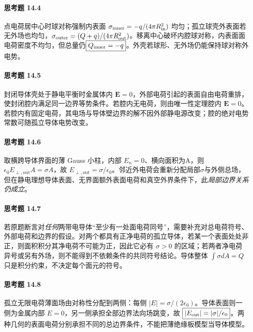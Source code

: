 \paragraph{思考题 14.4}
点电荷居中心时球对称强制内表面 \(\sigma_{\rm inner}=-q/(4\pi R_{\rm in}^2)\) 均匀；孤立球壳外表面若无外场也均匀，\(\sigma_{\rm outer}=(Q+q)/(4\pi R_{\rm out}^2)\)。移离中心破坏内腔球对称，内表面面电荷密度不均匀，但总量仍\(\boxed{Q_{\rm inner}=-q}\)。外壳若球形、无外场仍能保持球对称外电势。

\paragraph{思考题 14.5}
封闭导体壳处于静电平衡时金属体内 \(\boldsymbol E=0\)，外部电荷引起的表面自由电荷重排，使封闭腔内满足同一边界等势条件。若腔内无电荷，则由唯一性定理腔内 \(\boldsymbol E=0\)。若腔内有固定电荷，其电场与导体壁边界的解不因外部静电源改变；腔的绝对电势常数可随孤立导体电势改变。

\paragraph{思考题 14.6}
取横跨导体界面的薄 Gauss 小柱，内部 \(E_n=0\)、横向面积为A，则 \(\epsilon_0 E_{\perp,\mathrm{out}}A=\sigma A\)，故 \(\boxed{E_{\perp,\mathrm{out}}=\sigma/\epsilon_0}\)。邻近外电荷会重新分配局部\(\sigma\)与外侧总场，但在静电理想导体表面、无界面额外表面电荷和真空外界条件下，此\emph{局部边界关系仍成立}。

\paragraph{思考题 14.7}
若原题断言对\emph{任何}两带电导体“至少有一处面电荷同号”，需要补充对总电荷符号、外部电荷和边界的假设。对两个都具有正净电荷的孤立导体，若某一个表面处处非正，则面积积分其净电荷不可能为正，因此它必有 \(\sigma>0\) 的区域；若两者净电荷异号或另有外场，则不能得到不依赖条件的共同符号结论。导体整体 \(\int\sigma dA=Q\) 只是积分约束，不决定每个面元的符号。

\paragraph{思考题 14.8}
孤立无限电荷薄面场由对称性分配到两侧：每侧 \(\boxed{|E|=\sigma/(2\epsilon_0)}\)。导体表面则一侧为金属内部 \(E=0\)，另一侧承担全部边界法向场跳变，故 \(\boxed{|E_{\rm out}|=|\sigma|/\epsilon_0}\)。两种几何的表面电荷分别承担不同的总边界条件，不能把薄绝缘板模型当导体模型。

